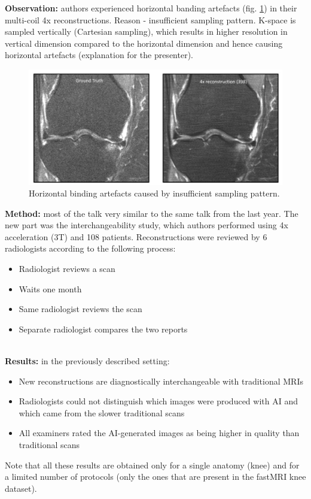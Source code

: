 {\bf Observation:} authors experienced horizontal banding artefacts (fig. \ref{fig:binding_artecats}) in their multi-coil 4x reconstructions. 
Reason - insufficient sampling pattern. 
K-space is sampled vertically (Cartesian sampling), which results in higher resolution in vertical dimension compared to the horizontal dimension and hence causing horizontal artefacts (explanation for the presenter). \\

\begin{figure}[h!]
    \centering
    \includegraphics[scale=0.4]{neurips-2020/images/Screenshot 2020-12-13 at 22.32.40.png}
    \caption{Horizontal binding artefacts caused by insufficient sampling pattern.}
    \label{fig:binding_artecats}
\end{figure} 

{\bf Method:} most of the talk very similar to the same talk from the last year. 
The new part was the interchangeability study, which authors performed using 4x acceleration (3T) and 108 patients. 
Reconstructions were reviewed by 6 radiologists according to the following process:
\begin{itemize}
    \item Radiologist reviews a scan
    \item Waits one month
    \item Same radiologist reviews the scan
    \item Separate radiologist compares the two reports
\end{itemize} \\

{\bf Results:} in the previously described setting:
\begin{itemize}
    \item New reconstructions are diagnostically interchangeable with traditional MRIs
    \item Radiologists could not distinguish which images were produced with AI and which came from the slower traditional scans
    \item All examiners rated the AI-generated images as being higher in quality than traditional scans
\end{itemize}

Note that all these results are obtained only for a single anatomy (knee) and for a limited number of protocols (only the ones that are present in the fastMRI knee dataset).







